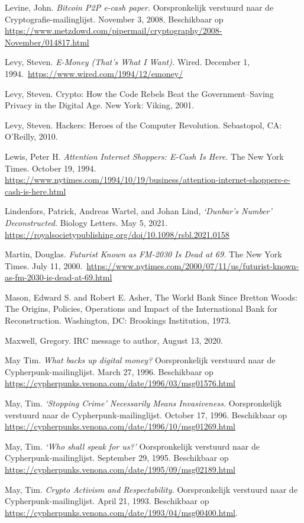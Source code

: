 \documentclass[
  a5paper,
  smalldemyvopaper,11pt,twoside,onecolumn,openright,extrafontsizes,
hidelinks]{memoir}
\begin{document}
{Levine, John. \emph{Bitcoin P2P e-cash paper.} Oorspronkelijk verstuurd
naar de Cryptografie-mailinglijst. November 3, 2008. Beschikbaar op
\url{https://www.metzdowd.com/pipermail/cryptography/2008-November/014817.html}

Levy, Steven. \emph{E-Money (That's What I Want).} Wired. December 1,
1994.~\url{https://www.wired.com/1994/12/emoney/}

Levy, Steven. Crypto: How the Code Rebels Beat the Government--Saving
Privacy in the Digital Age. New York: Viking, 2001.

Levy, Steven. Hackers: Heroes of the Computer Revolution. Sebastopol,
CA: O'Reilly, 2010.

Lewis, Peter H. \emph{Attention Internet Shoppers: E-Cash Is Here.} The
New York Times. October 19, 1994.
\url{https://www.nytimes.com/1994/10/19/business/attention-internet-shoppers-e-cash-is-here.html}

Lindenfors, Patrick, Andreas Wartel, and Johan Lind, \emph{`Dunbar's
Number' Deconstructed.} Biology Letters. May 5, 2021.
\url{https://royalsocietypublishing.org/doi/10.1098/rsbl.2021.0158}

Martin, Douglas. \emph{Futurist Known as FM-2030 Is Dead at 69.} The New
York Times. July 11,
2000.~\url{https://www.nytimes.com/2000/07/11/us/futurist-known-as-fm-2030-is-dead-at-69.html}

Mason, Edward S. and Robert E. Asher, The World Bank Since Bretton
Woods: The Origins, Policies, Operations and Impact of the International
Bank for Reconstruction. Washington, DC: Brookings Institution, 1973.

Maxwell, Gregory. IRC message to author, August 13, 2020.

May Tim. \emph{What backs up digital money?} Oorspronkelijk verstuurd
naar de Cypherpunk-mailinglijst. March 27, 1996. Beschikbaar op
\url{https://cypherpunks.venona.com/date/1996/03/msg01576.html}

May, Tim. \emph{`Stopping Crime' Necessarily Means Invasiveness.}
Oorspronkelijk verstuurd naar de Cypherpunk-mailinglijst. October 17,
1996. Beschikbaar op
\url{https://cypherpunks.venona.com/date/1996/10/msg01269.html}

May, Tim. \emph{`Who shall speak for us?'} Oorspronkelijk verstuurd naar
de Cypherpunk-mailinglijst. September 29, 1995. Beschikbaar op
\url{https://cypherpunks.venona.com/date/1995/09/msg02189.html}

May, Tim. \emph{Crypto Activism and Respectability.} Oorspronkelijk
verstuurd naar de Cypherpunk-mailinglijst. April 21, 1993. Beschikbaar
op \url{https://cypherpunks.venona.com/date/1993/04/msg00400.html}.

}
\end{document}
